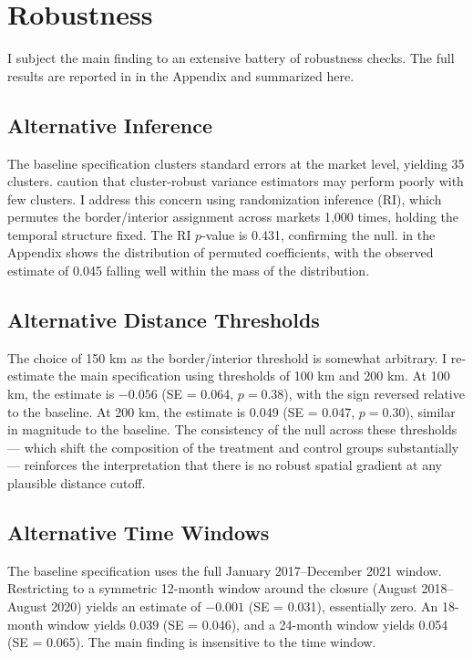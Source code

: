 \documentclass[12pt]{article}
\begin{document}
\section{Robustness}
\label{sec:robustness}

I subject the main finding to an extensive battery of robustness checks. The full results are reported in  in the Appendix and summarized here.

\subsection{Alternative Inference}

The baseline specification clusters standard errors at the market level, yielding 35 clusters. \citet{cameron2008bootstrap} caution that cluster-robust variance estimators may perform poorly with few clusters. I address this concern using randomization inference (RI), which permutes the border/interior assignment across markets 1,000 times, holding the temporal structure fixed. The RI $p$-value is 0.431, confirming the null.  in the Appendix shows the distribution of permuted coefficients, with the observed estimate of 0.045 falling well within the mass of the distribution.

\subsection{Alternative Distance Thresholds}

The choice of 150 km as the border/interior threshold is somewhat arbitrary. I re-estimate the main specification using thresholds of 100 km and 200 km. At 100 km, the estimate is $-0.056$ (SE = 0.064, $p = 0.38$), with the sign reversed relative to the baseline. At 200 km, the estimate is 0.049 (SE = 0.047, $p = 0.30$), similar in magnitude to the baseline. The consistency of the null across these thresholds --- which shift the composition of the treatment and control groups substantially --- reinforces the interpretation that there is no robust spatial gradient at any plausible distance cutoff.

\subsection{Alternative Time Windows}

The baseline specification uses the full January 2017--December 2021 window. Restricting to a symmetric 12-month window around the closure (August 2018--August 2020) yields an estimate of $-0.001$ (SE = 0.031), essentially zero. An 18-month window yields 0.039 (SE = 0.046), and a 24-month window yields 0.054 (SE = 0.065). The main finding is insensitive to the time window.
\end{document}

